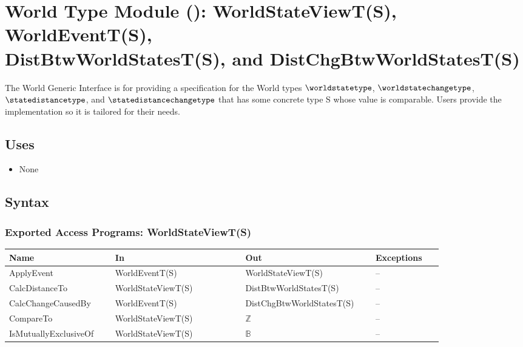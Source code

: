 \section[World Type Module (\mref{mWorld}): WorldStateViewT(S), WorldEventT(S),
DistBtwWorldStatesT(S), and DistChgBtwWorldStatesT(S)]{World Type Module
(): WorldStateViewT(S), WorldEventT(S), \\ DistBtwWorldStatesT(S),
and DistChgBtwWorldStatesT(S)}\label{worldstateModule}
The World Generic Interface is for providing a specification for the World
types $\worldstatetype$, $\worldstatechangetype$, $\statedistancetype$, and
$\statedistancechangetype$ that has some concrete type S whose value is
comparable. Users provide the implementation so it is tailored for their needs.

\subsection{Uses}
\begin{itemize}[noitemsep, nosep]

    \item None

\end{itemize}

\subsection{Syntax}

\subsubsection{Exported Access Programs: WorldStateViewT(S)}

\begin{center}
    \renewcommand{\arraystretch}{1.1}
    \begin{tabular}{m{0.22\linewidth} m{0.27\linewidth}m{0.27\linewidth}
            m{0.14\linewidth}}
        \toprule
        \textbf{Name} & \textbf{In} & \textbf{Out} & \textbf{Exceptions} \\
        \midrule

        \rowcolor[gray]{0.9}ApplyEvent & WorldEventT(S) & WorldStateViewT(S)
        & -- \\

        CalcDistanceTo & WorldStateViewT(S) & DistBtwWorldStatesT(S) & -- \\

        \rowcolor[gray]{0.9}CalcChangeCausedBy & WorldEventT(S) &
        DistChgBtwWorldStatesT(S) & -- \\

        CompareTo & WorldStateViewT(S) & $\mathbb{Z}$ & -- \\

        \rowcolor[gray]{0.9}IsMutuallyExclusiveOf & WorldStateViewT(S) &
        $\mathbb{B}$ & -- \\

        \bottomrule
    \end{tabular}
\end{center}

